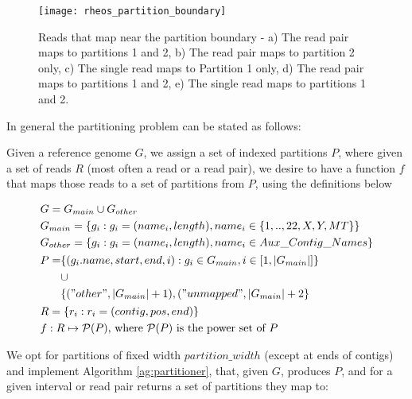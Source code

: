 \begin{figure}[H]
    \texttt{[image: rheos\_partition\_boundary]}
    \centering
    \caption {Reads that map near the partition boundary - a) The read pair maps to partitions 1 and 2, b) The read pair maps to partition 2 only, c) The single read maps to Partition 1 only, d) The read pair maps to partitions 1 and 2, e) The single read maps to partitions 1 and 2.}
    \label{fig:rheos_partition_boundary}
\end{figure}

In general the partitioning problem can be stated as follows:

Given a reference genome $G$, we assign a set of indexed partitions $P$, where given a set of reads $R$ (most often a read or a read pair), we desire to have a function $f$ that maps those reads to a set of partitions from $P$, using the definitions below

\begin{align*}
    &G = G_{main} \cup G_{other}\\
    &G_{main} = \{g_i: g_i = (name_i, length), name_i \in \{1,..,22,X,Y,MT\}\}\\
    &G_{other} = \{g_i: g_i = (name_i, length), name_i \in Aux\_Contig\_Names\}\\
    &\begin{aligned}P = &\{(g_i.name, start, end, i) : g_i \in G_{main}, i \in [1,|G_{main}|]\} \\
   & \cup\\ 
    &\{("other",|G_{main}|+1), ("unmapped",|G_{main}|+2\}\\
    \end{aligned}\\
    &R = \{r_i: r_i = (contig, pos, end)\}\\
    &f:R \mapsto \mathcal{P}(P)\text{, where }\mathcal{P}(P)\text{ is the power set of }P
\end{align*}

We opt for partitions of fixed width $partition\_width$ (except at ends of contigs) and implement Algorithm \ref{ag:partitioner}, that, given $G$, produces $P$, and for a given interval or read pair returns a set of partitions they map to:

